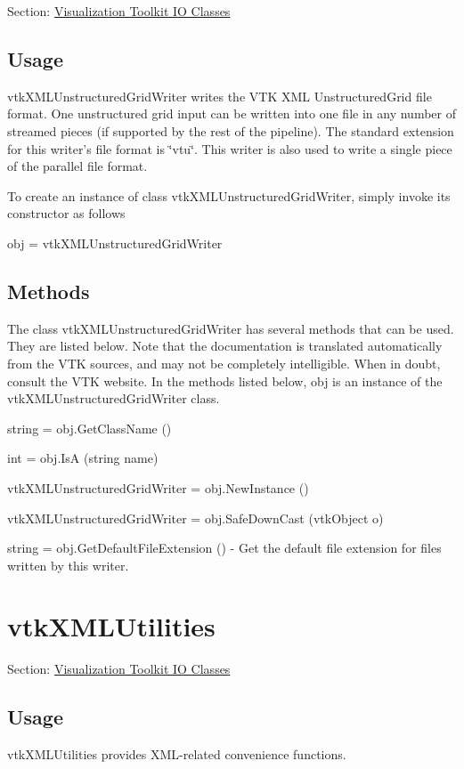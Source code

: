 Section\-: \hyperlink{sec_vtkio}{Visualization Toolkit I\-O Classes} \hypertarget{vtkwidgets_vtkxyplotwidget_Usage}{}\subsection{Usage}\label{vtkwidgets_vtkxyplotwidget_Usage}
vtk\-X\-M\-L\-Unstructured\-Grid\-Writer writes the V\-T\-K X\-M\-L Unstructured\-Grid file format. One unstructured grid input can be written into one file in any number of streamed pieces (if supported by the rest of the pipeline). The standard extension for this writer's file format is \char`\"{}vtu\char`\"{}. This writer is also used to write a single piece of the parallel file format.

To create an instance of class vtk\-X\-M\-L\-Unstructured\-Grid\-Writer, simply invoke its constructor as follows \begin{DoxyVerb}  obj = vtkXMLUnstructuredGridWriter
\end{DoxyVerb}
 \hypertarget{vtkwidgets_vtkxyplotwidget_Methods}{}\subsection{Methods}\label{vtkwidgets_vtkxyplotwidget_Methods}
The class vtk\-X\-M\-L\-Unstructured\-Grid\-Writer has several methods that can be used. They are listed below. Note that the documentation is translated automatically from the V\-T\-K sources, and may not be completely intelligible. When in doubt, consult the V\-T\-K website. In the methods listed below, {\ttfamily obj} is an instance of the vtk\-X\-M\-L\-Unstructured\-Grid\-Writer class. 
\begin{DoxyItemize}
\item {\ttfamily string = obj.\-Get\-Class\-Name ()}  
\item {\ttfamily int = obj.\-Is\-A (string name)}  
\item {\ttfamily vtk\-X\-M\-L\-Unstructured\-Grid\-Writer = obj.\-New\-Instance ()}  
\item {\ttfamily vtk\-X\-M\-L\-Unstructured\-Grid\-Writer = obj.\-Safe\-Down\-Cast (vtk\-Object o)}  
\item {\ttfamily string = obj.\-Get\-Default\-File\-Extension ()} -\/ Get the default file extension for files written by this writer.  
\end{DoxyItemize}\hypertarget{vtkio_vtkxmlutilities}{}\section{vtk\-X\-M\-L\-Utilities}\label{vtkio_vtkxmlutilities}
Section\-: \hyperlink{sec_vtkio}{Visualization Toolkit I\-O Classes} \hypertarget{vtkwidgets_vtkxyplotwidget_Usage}{}\subsection{Usage}\label{vtkwidgets_vtkxyplotwidget_Usage}
vtk\-X\-M\-L\-Utilities provides X\-M\-L-\/related convenience functions.

